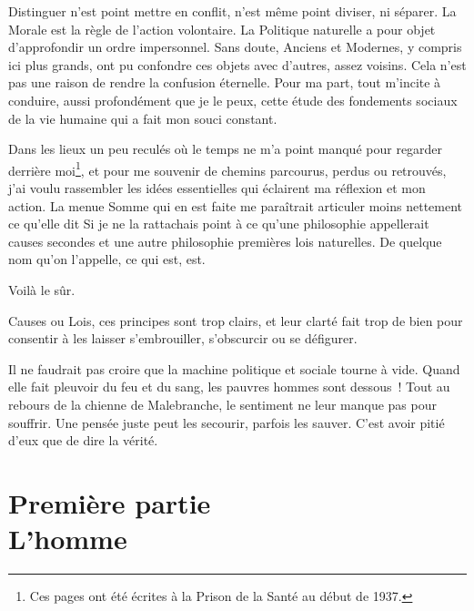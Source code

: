 \documentclass[french,twoside]{book} %
\newcommand\chapteropen{} %
\newcommand\chaptercont{} %
\newcommand\chapterclose{} %
\begin{document}
Distinguer n’est point mettre en conflit, n’est même point diviser, ni séparer. La Morale est la règle de l’action volontaire. La Politique naturelle a pour objet d’approfondir un ordre impersonnel. Sans doute, Anciens et Modernes, y compris ici plus grands, ont pu confondre ces objets avec d’autres, assez voisins. Cela n’est pas une raison de rendre la confusion éternelle. Pour ma part, tout m’incite à conduire, aussi profondément que je le peux, cette étude des fondements sociaux de la vie humaine qui a fait mon souci constant.\par
Dans les lieux un peu reculés où le temps ne m’a point manqué pour regarder derrière moi\footnote{Ces pages ont été écrites à la Prison de la Santé au début de 1937.}, et pour me souvenir de chemins parcourus, perdus ou retrouvés, j’ai voulu rassembler les idées essentielles qui éclairent ma réflexion et mon action. La menue Somme qui en est faite me paraîtrait articuler moins nettement ce qu’elle dit Si je ne la rattachais point à ce qu’une philosophie appellerait causes secondes et une autre philosophie premières lois naturelles. De quelque nom qu’on l’appelle, ce qui est, est.\par
Voilà le sûr.\par
Causes ou Lois, ces principes sont trop clairs, et leur clarté fait trop de bien pour consentir à les laisser s’embrouiller, s’obscurcir ou se défigurer.\par
Il ne faudrait pas croire que la machine politique et sociale tourne à vide. Quand elle fait pleuvoir du feu et du sang, les pauvres hommes sont dessous ! Tout au rebours de la chienne de Malebranche, le sentiment ne leur manque pas pour souffrir. Une pensée juste peut les secourir, parfois les sauver. C’est avoir pitié d’eux que de dire la vérité.\par
\bigbreak
\bigbreak
\chapterclose


\chapteropen
\chapter[Première partie. L’homme]{Première partie \\
L’homme}\renewcommand{\leftmark}{Première partie \\
L’homme}


\chaptercont
\end{document}
